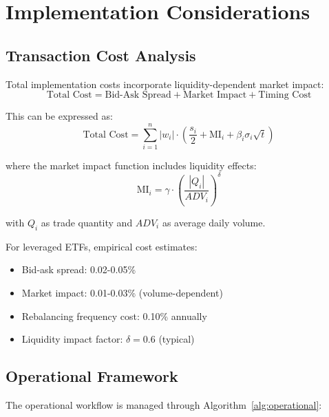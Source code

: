 \documentclass[onecolumn,11pt]{IEEEtran}
\begin{document}
\section{Implementation Considerations}

\subsection{Transaction Cost Analysis}

Total implementation costs incorporate liquidity-dependent market impact:
\begin{equation}
\text{Total Cost} = \text{Bid-Ask Spread} + \text{Market Impact} + \text{Timing Cost}
\end{equation}

This can be expressed as:
\begin{equation}
\text{Total Cost} = \sum_{i=1}^n |w_i| \cdot \left(\frac{s_i}{2} + \text{MI}_i + \beta_i \sigma_i \sqrt{t}\right)
\end{equation}

where the market impact function includes liquidity effects:
\begin{equation}
\text{MI}_i = \gamma \cdot \left(\frac{|Q_i|}{ADV_i}\right)^\delta
\end{equation}

with $Q_i$ as trade quantity and $ADV_i$ as average daily volume.

For leveraged ETFs, empirical cost estimates:
\begin{itemize}
    \item Bid-ask spread: 0.02-0.05\%
    \item Market impact: 0.01-0.03\% (volume-dependent)
    \item Rebalancing frequency cost: 0.10\% annually
    \item Liquidity impact factor: $\delta = 0.6$ (typical)
\end{itemize}

\subsection{Operational Framework}

The operational workflow is managed through Algorithm~\ref{alg:operational}:
\end{document}
